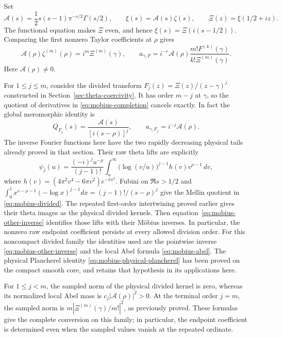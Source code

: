 Set
\[
 \mathcal A(s)=\frac12s(s-1)\pi^{-s/2}\Gamma(s/2),
 \qquad \xi(s)=\mathcal A(s)\zeta(s),
 \qquad \Xi(z)=\xi(1/2+iz).
\]
The functional equation makes \(\Xi\) even, and hence
\(\xi(s)=\Xi(i(s-1/2))\). Comparing the first nonzero
Taylor coefficients at \(\rho\) gives
\begin{equation}\label{eq:mobius-completion}
 \mathcal A(\rho)\zeta^{(m)}(\rho)
       =i^m\Xi^{(m)}(\gamma),
 \qquad
 a_{\gamma,F}
       =i^{-r}\mathcal A(\rho)
          \frac{m!F^{(k)}(\gamma)}{k!\Xi^{(m)}(\gamma)}.
\end{equation}
Here \(\mathcal A(\rho)\ne0\).

For \(1\le j\le m\), consider the divided transform
\(F_j(z)=\Xi(z)/(z-\gamma)^j\) constructed in
Section~\ref{sec:theta-coercivity}. It has order \(m-j\) at
\(\gamma\), so the quotient of derivatives in
\eqref{eq:mobius-completion} cancels exactly. In fact the global
meromorphic identity is
\begin{equation}\label{eq:mobius-divided}
 Q_{F_j}(s)=\frac{\mathcal A(s)}{[i(s-\rho)]^j},
 \qquad a_{\gamma,F_j}=i^{-j}\mathcal A(\rho).
\end{equation}
The inverse Fourier functions here have the two rapidly decreasing
physical tails already proved in that section. Their raw theta
lifts are explicitly
\[
 \psi_j(u)=\frac{(-i)^j u^{-\rho}}{(j-1)!}
       \int_u^\infty\!\bigl(\log(v/u)\bigr)^{j-1}
                         h(v)v^{\rho-1}\,dv,
\]
where \(h(v)=(4\pi^2v^4-6\pi v^2)e^{-\pi v^2}\).
Fubini on \(\Re s>1/2\) and
\(\int_0^1 x^{s-\rho-1}(-\log x)^{j-1}dx
 =(j-1)!/(s-\rho)^j\)
give the Mellin quotient in \eqref{eq:mobius-divided}.
The repeated first-order intertwining proved earlier gives their
theta images as the physical divided kernels. Then
equation~\eqref{eq:mobius-other-inverse} identifies those lifts with
their M\"obius inverses. In particular, the nonzero raw endpoint
coefficient persists at every allowed division order.
For this noncompact divided family the identities used are the
pointwise inverse \eqref{eq:mobius-other-inverse} and the local Abel
formula \eqref{eq:mobius-abel}. The physical Plancherel identity
\eqref{eq:mobius-physical-plancherel} has been proved on the compact
smooth core, and retains that hypothesis in its applications here.

For \(1\le j<m\), the sampled norm of the physical
divided kernel is zero, whereas its normalized local Abel mass is
\(c_j|\mathcal A(\rho)|^2>0\). At the terminal order \(j=m\),
the sampled norm is
\(m|\Xi^{(m)}(\gamma)/m!|^2\), as previously proved.
These formulas give the complete conversion on this family;
in particular, the endpoint coefficient is determined even when
the sampled values vanish at the repeated ordinate.

